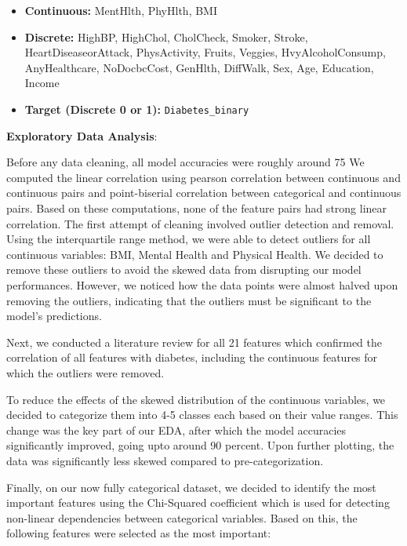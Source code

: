 \documentclass[conference]{IEEEtran}
\begin{document}
\begin{itemize}
  \item \textbf{Continuous:} MentHlth, PhyHlth, BMI
  \item \textbf{Discrete:} HighBP, HighChol, CholCheck, Smoker, Stroke, HeartDiseaseorAttack, PhysActivity, Fruits, Veggies, HvyAlcoholConsump, AnyHealthcare, NoDocbcCost, GenHlth, DiffWalk, Sex, Age, Education, Income
  \item \textbf{Target (Discrete 0 or 1):} \texttt{Diabetes\_binary}
\end{itemize}

\vspace{1em}

\noindent
\textbf{Exploratory Data Analysis}:

Before any data cleaning, all model accuracies were roughly around 75%
We computed the linear correlation using pearson correlation between continuous and continuous pairs and point-biserial correlation between categorical and continuous pairs.  Based on these computations, none of the feature pairs had strong linear correlation.  
The first attempt of cleaning involved outlier detection and removal.  Using the interquartile range method, we were able to detect outliers for all continuous variables: BMI, Mental Health and Physical Health.  We decided to remove these outliers to avoid the skewed data from disrupting our model performances.  However, we noticed how the data points were almost halved upon removing the outliers, indicating that the outliers must be significant to the model’s predictions. 

Next, we conducted a literature review for all 21 features which confirmed the correlation of all features with diabetes, including the continuous features for which the outliers were removed.  

To reduce the effects of the skewed distribution of the continuous variables, we decided to categorize them into 4-5 classes each based on their value ranges.  This change was the key part of our EDA, after which the model accuracies significantly improved, going upto around 90 percent.  Upon further plotting, the data was significantly less skewed compared to pre-categorization.

Finally, on our now fully categorical dataset, we decided to identify the most important features using the Chi-Squared coefficient which is used for detecting non-linear dependencies between categorical variables. Based on this, the following features were selected as the most important:  
\end{document}
